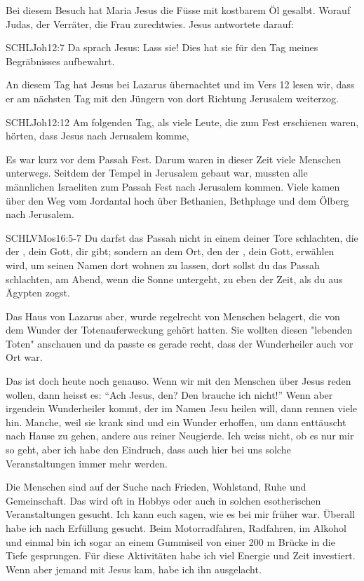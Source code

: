 \documentclass[fontsize=16pt]{mybib}
\begin{document}
    Bei diesem Besuch hat Maria Jesus die Füsse mit kostbarem Öl gesalbt. Worauf Judas, der Verräter, die Frau zurechtwies. Jesus antwortete darauf:
    \begin{bibelbox}{SCHL}{Joh}{12:7}
    Da sprach Jesus: Lass sie! Dies hat sie für den Tag meines Begräbnisses aufbewahrt.
    \end{bibelbox}
    An diesem Tag hat Jesus bei Lazarus übernachtet und im Vers 12 lesen wir, dass er am nächsten Tag mit den Jüngern von dort Richtung Jerusalem weiterzog.
    \begin{bibelbox}{SCHL}{Joh}{12:12}
    Am folgenden Tag, als viele Leute, die zum Fest erschienen waren, hörten, dass Jesus nach Jerusalem komme,
    \end{bibelbox}
    Es war kurz vor dem Passah Fest. Darum waren in dieser Zeit viele Menschen unterwegs. Seitdem der Tempel in Jerusalem gebaut war, mussten alle männlichen Israeliten zum Passah Fest nach Jerusalem kommen. Viele kamen über den Weg vom Jordantal hoch über Bethanien, Bethphage und dem Ölberg nach Jerusalem.
    \begin{bibelbox}{SCHL}{VMos}{16:5-7}
    Du darfst das Passah nicht in einem deiner Tore schlachten, die der \herr , dein Gott, dir gibt; sondern an dem Ort, den der \herr , dein Gott, erwählen wird, um seinen Namen dort wohnen zu lassen, dort sollst du das Passah schlachten, am Abend, wenn die Sonne untergeht, zu eben der Zeit, als du aus Ägypten zogst.
    \end{bibelbox}

    Das Haus von Lazarus aber, wurde regelrecht von Menschen belagert, die von dem Wunder der Totenauferweckung gehört hatten. Sie wollten diesen "lebenden Toten" anschauen und da passte es gerade recht, dass der Wunderheiler auch vor Ort war.

    Das ist doch heute noch genauso. Wenn wir mit den Menschen über Jesus reden wollen, dann heisst es: \enquote{Ach Jesus, den? Den brauche ich nicht!} Wenn aber irgendein Wunderheiler kommt, der im Namen Jesu heilen will, dann rennen viele hin. Manche, weil sie krank sind und ein Wunder erhoffen, um dann enttäuscht nach Hause zu gehen, andere aus reiner Neugierde. Ich weiss nicht, ob es nur mir so geht, aber ich habe den Eindruch, dass auch hier bei uns solche Veranstaltungen immer mehr werden.

    Die Menschen sind auf der Suche nach Frieden, Wohlstand, Ruhe und Gemeinschaft. Das wird oft in Hobbys oder auch in solchen esotherischen Veranstaltungen gesucht. Ich kann euch sagen, wie es bei mir früher war. Überall habe ich nach Erfüllung gesucht. Beim Motorradfahren, Radfahren, im Alkohol und einmal bin ich sogar an einem Gummiseil von einer 200 m Brücke in die Tiefe gesprungen. Für diese Aktivitäten habe ich viel Energie und Zeit investiert. Wenn aber jemand mit Jesus kam, habe ich ihn ausgelacht.
\end{document}
